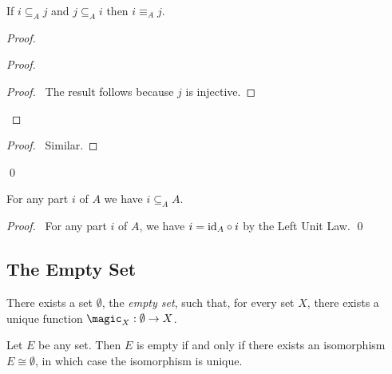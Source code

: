\begin{prop}
  If $i \subseteq_A j$ and $j \subseteq_A i$ then $i \equiv_A j$.
\end{prop}

\begin{proof}
  \pf
  \begin{proof}
    \qedstep
    \begin{proof}
      \pf\ The result follows because $j$ is injective.
    \end{proof}
  \end{proof}
  \begin{proof}
    \pf\ Similar.
  \end{proof}
  \qed
\end{proof}

\begin{prop}
  For any part $i$ of $A$ we have $i \subseteq_A A$.
\end{prop}

\begin{proof}
  \pf\ For any part $i$ of $A$, we have $i = \mathrm{id}_{A} \circ i$ by the Left Unit Law. \qed
\end{proof}

\subsection{The Empty Set}

\begin{ax}
  There exists a set $\emptyset$, the \emph{empty set}, such that, for every
  set $X$, there exists a unique function $\magic_X : \emptyset \rightarrow
  X$.
\end{ax}

\begin{prop}
  \label{prop:sets:empty:unique}
  Let $E$ be any set. Then $E$ is empty if and only if there exists an isomorphism $E \cong \emptyset$, in which case the isomorphism is unique.
\end{prop}

